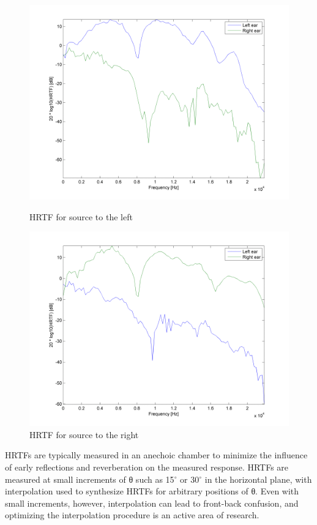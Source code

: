 \documentclass[BTech]{nitkdiss}
\begin{document}
\begin{figure}[!tbp]
  \centering
  \begin{minipage}[b]{0.45\textwidth}
    \includegraphics[width=\textwidth]{hrtf_left}
    \caption{HRTF for source to the left}
  \end{minipage}
  \hfill
  \begin{minipage}[b]{0.45\textwidth}
    \includegraphics[width=\textwidth]{hrtf_right}
    \caption{HRTF for source to the right }
  \end{minipage}
\end{figure}
HRTFs are typically measured in an anechoic chamber to minimize the influence of early reflections and reverberation on the measured response. HRTFs are measured at small increments of θ such as 15$^{\circ}$ or 30$^{\circ}$ in the horizontal plane, with interpolation used to synthesize HRTFs for arbitrary positions of θ. Even with small increments, however, interpolation can lead to front-back confusion, and optimizing the interpolation procedure is an active area of research. 
\end{document}
